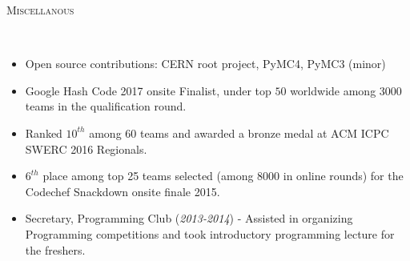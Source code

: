 \documentclass[9pt]{article}
\newenvironment{changemargin}[2]{%
  \begin{list}{}{%
      \setlength{\topsep}{0pt}%
    \setlength{\leftmargin}{#1}%
    \setlength{\rightmargin}{#2}%
    \setlength{\listparindent}{\parindent}%
  \setlength{\itemindent}{\parindent}%
    \setlength{\parsep}{\parskip}%
    }%
  \item[]}{\end{list}
    }
\newcommand{\lineover}{
  \begin{changemargin}{-0.05in}{-0.10in}
    \vspace*{-9pt}
    \hrulefill \\
    \vspace*{-2pt}
  \end{changemargin}
}
\newcommand{\header}[1]{
  \begin{changemargin}{-0.5in}{-0.5in}
    \scshape{#1}\\
        \lineover
  \end{changemargin}
}
\newenvironment{body} {
  \vspace*{-16pt}
        \begin{changemargin}{-0.6in}{-0.65in}
        }	
        {\end{changemargin}
}
\begin{document}
\vspace{2 mm}
\header{Miscellanous}
\begin{body}
  \vspace{14pt}
        \begin{changemargin}{0.15in}{0.15in}
          \begin{itemize}
            \item Open source contributions: CERN root project, PyMC4, PyMC3 (minor)
            \item Google Hash Code 2017 onsite Finalist, under top $50$ worldwide 
              among 3000 teams in the qualification round.
            \item Ranked $10^{th}$ among 60 teams and awarded a bronze medal at 
              ACM ICPC SWERC 2016 Regionals.
            \item $6^{th}$ place among top 25 teams selected (among 8000 in online 
              rounds) for the Codechef Snackdown onsite finale 2015. \\
            \item Secretary, Programming Club (\textit{2013-2014}) - Assisted in
              organizing Programming competitions 
              and took introductory programming lecture for the freshers.

\end{itemize}
\end{changemargin}
\end{body}
\end{document}
